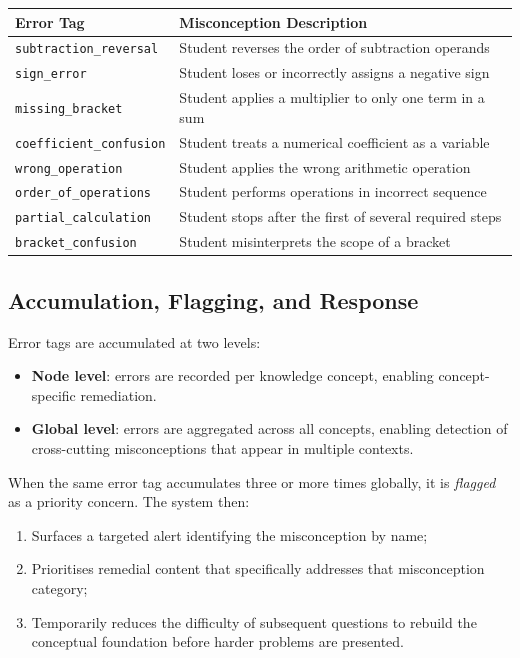 \documentclass[12pt,a4paper]{article}
\begin{document}
\begin{center}
\begin{tabular}{p{4.5cm} p{7.5cm}}
  \toprule
  \textbf{Error Tag} & \textbf{Misconception Description} \\
  \midrule
  \texttt{subtraction\_reversal}    & Student reverses the order of subtraction operands \\
  \texttt{sign\_error}              & Student loses or incorrectly assigns a negative sign \\
  \texttt{missing\_bracket}         & Student applies a multiplier to only one term in a sum \\
  \texttt{coefficient\_confusion}   & Student treats a numerical coefficient as a variable \\
  \texttt{wrong\_operation}         & Student applies the wrong arithmetic operation \\
  \texttt{order\_of\_operations}    & Student performs operations in incorrect sequence \\
  \texttt{partial\_calculation}     & Student stops after the first of several required steps \\
  \texttt{bracket\_confusion}       & Student misinterprets the scope of a bracket \\
  \bottomrule
\end{tabular}
\end{center}

\subsection{Accumulation, Flagging, and Response}

Error tags are accumulated at two levels:

\begin{itemize}[leftmargin=1.8em]
  \item \textbf{Node level}: errors are recorded per knowledge concept,
        enabling concept-specific remediation.
  \item \textbf{Global level}: errors are aggregated across all concepts,
        enabling detection of cross-cutting misconceptions that appear in
        multiple contexts.
\end{itemize}

When the same error tag accumulates three or more times globally, it is
\emph{flagged} as a priority concern.  The system then:

\begin{enumerate}[leftmargin=2em]
  \item Surfaces a targeted alert identifying the misconception by name;
  \item Prioritises remedial content that specifically addresses that
        misconception category;
  \item Temporarily reduces the difficulty of subsequent questions to
        rebuild the conceptual foundation before harder problems are
        presented.
\end{enumerate}
\end{document}

